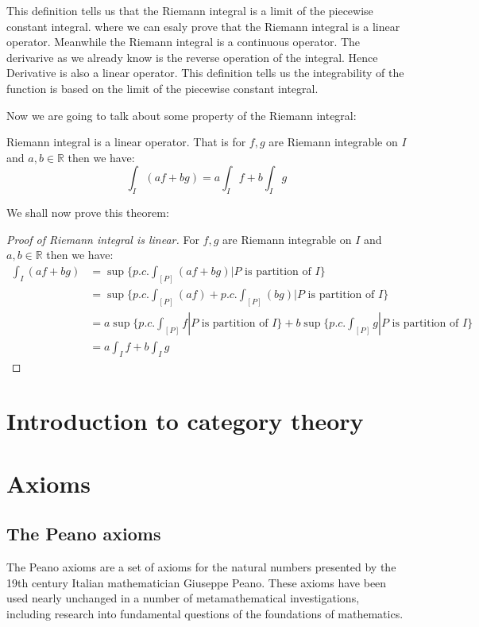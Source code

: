\documentclass{article}
\newcommand{\R}{\mathbb{R}}
\begin{document}
This definition tells us that the Riemann integral is a limit of the piecewise constant integral.
where we can esaly prove that the Riemann integral is a linear operator. Meanwhile the Riemann integral is a continuous operator. 
The derivarive as we already know is the reverse operation of the integral. Hence Derivative is also a linear operator. 
This definition tells us the integrability of the function is based on the limit of the piecewise constant integral. 


Now we are going to talk about some property of the Riemann integral:
\begin{theorem}
Riemann integral is a linear operator. That is for $f,g$ are Riemann integrable on $I$ and $a,b\in \R$ then we have:
$$\int_{I}(af+bg)=a\int_{I}f+b\int_{I}g$$
\end{theorem}

We shall now prove this theorem:

\begin{proof}[Proof of Riemann integral is linear]
  For $f,g$ are Riemann integrable on $I$ and $a,b\in \R$ then we have:
  \begin{equation*}
    \begin{aligned}
      \int_{I}(af+bg) &= \sup\{p.c.\int_{[P]}(af+bg)|P \text{ is partition of } I\}\\
      &= \sup\{p.c.\int_{[P]}(af)+p.c.\int_{[P]}(bg)|P \text{ is partition of } I\}\\
      &= a\sup\{p.c.\int_{[P]}f|P \text{ is partition of } I\}+b\sup\{p.c.\int_{[P]}g|P \text{ is partition of } I\}\\
      &= a\int_{I}f+b\int_{I}g
    \end{aligned}
  \end{equation*}
\end{proof}





\section{Introduction to category theory}






\section*{Axioms}

\subsection{The Peano axioms}
The Peano axioms are a set of axioms for the natural numbers presented by the 19th century Italian mathematician Giuseppe Peano.
These axioms have been used nearly unchanged in a number of metamathematical investigations, including research into fundamental questions of the foundations of mathematics.
\end{document}
